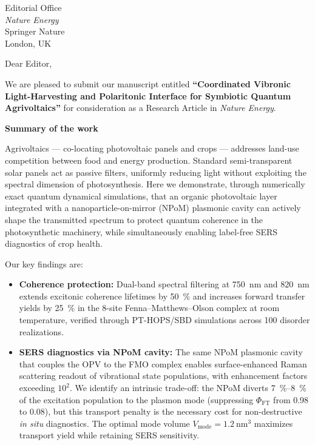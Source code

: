 \documentclass[12pt]{letter}
\begin{document}
\begin{letter}{Editorial Office\\
\textit{Nature Energy}\\
Springer Nature\\
London, UK}

\opening{Dear Editor,}

We are pleased to submit our manuscript entitled \textbf{``Coordinated Vibronic Light-Harvesting and Polaritonic Interface for Symbiotic Quantum Agrivoltaics''} for consideration as a Research Article in \textit{Nature Energy}.

\noindent\textbf{Summary of the work}

Agrivoltaics --- co-locating photovoltaic panels and crops --- addresses land-use competition between food and energy production. Standard semi-transparent solar panels act as passive filters, uniformly reducing light without exploiting the spectral dimension of photosynthesis. Here we demonstrate, through numerically exact quantum dynamical simulations, that an organic photovoltaic layer integrated with a nanoparticle-on-mirror (NPoM) plasmonic cavity can actively shape the transmitted spectrum to protect quantum coherence in the photosynthetic machinery, while simultaneously enabling label-free SERS diagnostics of crop health.

Our key findings are:

\begin{itemize}
\item \textbf{Coherence protection:} Dual-band spectral filtering at \SI{750}{\nm} and \SI{820}{\nm} extends excitonic coherence lifetimes by \SI{50}{\percent} and increases forward transfer yields by \SI{25}{\percent} in the 8-site Fenna--Matthews--Olson complex at room temperature, verified through PT-HOPS/SBD simulations across 100 disorder realizations.

\item \textbf{SERS diagnostics via NPoM cavity:} The same NPoM plasmonic cavity that couples the OPV to the FMO complex enables surface-enhanced Raman scattering readout of vibrational state populations, with enhancement factors exceeding $10^2$. We identify an intrinsic trade-off: the NPoM diverts \SI{7}{\percent}{--}\SI{8}{\percent} of the excitation population to the plasmon mode (suppressing $\Phi_{\mathrm{FT}}$ from 0.98 to 0.08), but this transport penalty is the necessary cost for non-destructive \emph{in situ} diagnostics. The optimal mode volume $V_{\mathrm{mode}} = \SI{1.2}{\nm\cubed}$ maximizes transport yield while retaining SERS sensitivity.


\end{itemize}
\end{letter}
\end{document}

